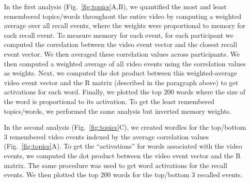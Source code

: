 \documentclass{article}
\begin{document}
In the first analysis (Fig.~\ref{fig:topics}A,B), we quantified the most and least remembered topics/words throughout the entire video by computing a weighted average over all recall events, where the weights were proportional to memory for each recall event. To measure memory for each event, for each participant we computed the correlation between the video event vector and the closest recall event vector. We then averaged these correlation values across participants. We then computed a weighted average of all video events using the correlation values as weights. Next, we computed the dot product between this weighted-average video event vector and the R matrix (described in the paragraph above) to get activations for each word. Finally, we plotted the top 200 words where the size of the word is proportional to its activation. To get the least remembered topics/words, we performed the same analysis but inverted memory weights.

In the second analysis (Fig.~\ref{fig:topics}C), we created wordles for the top/bottom 3 remembered video events indexed by the average correlation values (Fig.~\ref{fig:topics}A).  To get the ``activations'' for words associated with the video events, we computed the dot product between the video event vector and the R matrix. The same procedure was used to get word activations for the recall events. We then plotted the top 200 words for the top/bottom 3 recalled events.


\end{document}
